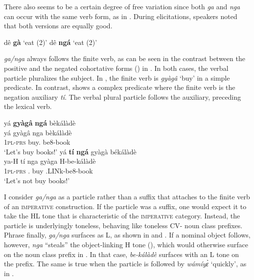 There also seems to be a certain degree of free variation since both {\itshape ga} and {\itshape nga} can occur with the same verb form, as in . During elicitations, speakers noted that both versions are equally good. 

\ea \label{IMPga}
  \ea \label{IMPgaa} dê {\bfseries gà} `eat (2{\PL})'
\ex dê {\bfseries ngá} `eat (2{\PL})'
\z
\z

{\itshape ga/nga} always follows the finite verb, as can be seen in the contrast between the positive and the negated cohortative forms () in . In both cases, the verbal particle pluralizes the subject.  In , the finite verb is {\itshape gyàgâ} `buy' in a simple predicate. In contrast,  shows a complex predicate where the finite verb is the negation auxiliary {\itshape tí}. The verbal plural particle follows the auxiliary, preceding the lexical verb.

\ea \label{IMPga2}
  \ea \label{IMPga2a}
  \glll  yá {\bfseries gyàgâ} {\bfseries ngá} bèkálàdè \\
        yá gyàgâ nga bèkálàdè \\
           1\textsc{pl}-\textsc{prs} buy.{\IMP} {\PL} be8-book  \\
    \trans `Let's buy books!'
\ex\label{IMPga2b}
  \glll  yá {\bfseries tí} {\bfseries ngá} gyàgà békálàdè \\
        ya-H tí nga gyàga H-be-kálàdè \\
           1\textsc{pl}-\textsc{prs} {\NEG}.{\R} {\PL} buy {\OBJ}.LINk-be8-book \\
    \trans `Let's not buy books!'
\z
\z

I consider {\itshape ga/nga} as a particle rather than a suffix that attaches to the finite verb of an \textsc{imperative} construction. If the particle was a suffix, one would expect it to take the HL tone that is characteristic of the \textsc{imperative} category. Instead, the particle is underlyingly toneless, behaving like toneless CV- noun class prefixes. Phrase finally, {\itshape ga/nga} surfaces as L, as shown in  and . If a nominal object follows, however,  {\itshape nga} ``steals'' the object-linking H tone (), which would otherwise surface on the noun class prefix in . In that case, {\itshape be-kálàdè} surfaces with an L tone on the prefix.
The same is true when the particle is followed by {\itshape wámíyɛ̀} `quickly', as in .

